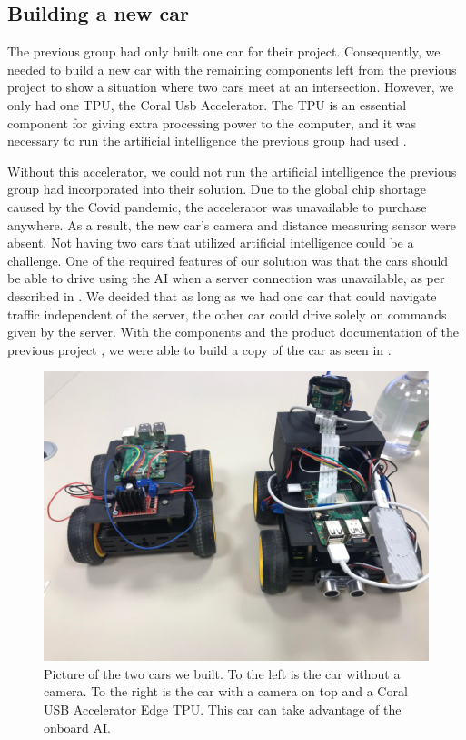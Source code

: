 \subsection{Building a new car}
The previous group had only built one car for their project. Consequently, we needed to build a new car with the remaining components left from the previous project to show a situation where two cars meet at an intersection. However, we only had one TPU, the Coral Usb Accelerator. The TPU is an essential component for giving extra processing power to the computer, and it was necessary to run the artificial intelligence the previous group had used \parencite{prev_project}. 

Without this accelerator, we could not run the artificial intelligence the previous group had incorporated into their solution. Due to the global chip shortage caused by the Covid pandemic, the accelerator was unavailable to purchase anywhere. As a result, the new car's camera and distance measuring sensor were absent. Not having two cars that utilized artificial intelligence could be a challenge. One of the required features of our solution was that the cars should be able to drive using the AI when a server connection was unavailable, as per described in . We decided that as long as we had one car that could navigate traffic independent of the server, the other car could drive solely on commands given by the server. With the components and the product documentation of the previous project , we were able to build a copy of the car as seen in .

\begin{figure}[h!]
	\centering
	\includegraphics[width=0.9\linewidth]{figures/two_cars}
	\caption{Picture of the two cars we built. To the left is the car without a camera. To the right is the car with a camera on top and a Coral USB Accelerator Edge TPU. This car can take advantage of the onboard AI.}
	\label{fig:twocars}
\end{figure}



